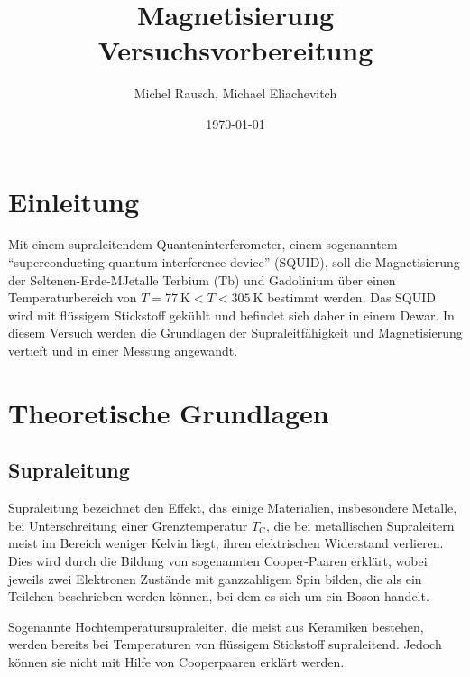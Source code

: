 \documentclass[a4paper,ngerman]{scrartcl}
\title{Magnetisierung\\Versuchsvorbereitung}
\date{\today}
\author{Michel Rausch, Michael Eliachevitch}
\begin{document}
\maketitle
\tableofcontents
\newpage

\section{Einleitung}


Mit einem supraleitendem Quanteninterferometer, einem sogenanntem
"`superconducting quantum interference device"' (SQUID), soll
die Magnetisierung der Seltenen-Erde-MJetalle Terbium (Tb) und
Gadolinium über einen Temperaturbereich von $T=
\SI{77}{\kelvin} < T < \SI{305}{\kelvin}$ bestimmt werden.
Das SQUID wird mit flüssigem Stickstoff gekühlt und befindet sich
daher in einem Dewar. In diesem Versuch werden die Grundlagen der
Supraleitfähigkeit und Magnetisierung vertieft und in einer Messung
angewandt.


\section{Theoretische Grundlagen}

\subsection{Supraleitung}

Supraleitung bezeichnet den Effekt, das einige Materialien,
insbesondere Metalle, bei Unterschreitung einer Grenztemperatur
$T_{\mathrm{C}}$, die bei metallischen Supraleitern meist im Bereich
weniger Kelvin liegt, ihren elektrischen Widerstand verlieren.
Dies wird durch die Bildung von sogenannten Cooper-Paaren erklärt,
wobei jeweils zwei Elektronen Zustände mit ganzzahligem
Spin bilden, die als ein Teilchen beschrieben werden können,
bei dem es sich um ein Boson handelt.


Sogenannte Hochtemperatursupraleiter, die meist aus Keramiken
bestehen, werden bereits bei Temperaturen von flüssigem Stickstoff
supraleitend.
Jedoch können sie nicht mit Hilfe von Cooperpaaren erklärt werden.  
\end{document}
